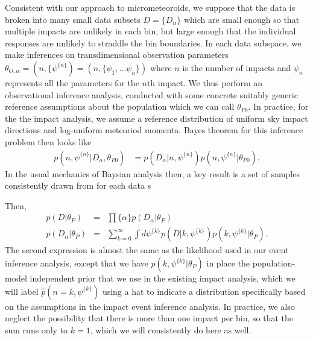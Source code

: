\documentclass[twocolumn,showpacs,aps,prd,nobibnotes,nofootinbib,floatfix]{revtex4-1}
\begin{document}
Consistent with our approach to micrometeoroids, we suppose that the data is broken into many small data subsets $D=\{D_\alpha\}$ which are small enough so that multiple impacts are unlikely in each bin, but large enough that the individual responses are unlikely to straddle the bin boundaries. 
In each data subspace, we make inferences on transdimensional observation parameters $\theta_{O,\alpha}=(n,\{\psi^{\{n\}})=(n,\{\psi_1,...\psi_n\})$ where $n$ is the number of impacts and $\psi_n$ represents all the parameters for the $n$th impact.
We thus perform an observational inference analysis, conducted with some concrete suitably generic reference assumptions about the population which we can call $\theta_{P0}$.  In practice, for the the impact analysis, we assume a reference distribution of uniform sky impact directions and log-uniform meteoriod momenta.  Bayes theorem for this inference problem then looks like
\begin{align}
  p(n,\psi^{\{n\}}|D_\alpha,\theta_{P0})&= p(D_\alpha|n,\psi^{\{n\}})p(n,\psi^{\{n\}}|\theta_{P0}).
\end{align}
In the usual mechanics of Baysian analysis then, a key result is a set of samples consistently drawn from for each data s

Then,
\begin{eqnarray}
  p(D|\theta_P)&=&\prod{\{\alpha\}} p(D_\alpha|\theta_P)\\
  p(D_\alpha|\theta_P)&=&\sum_{k=0}^\infty\int d\psi^{\{k\}} p(D|k,\psi^{\{k\}})p(k,\psi^{\{k\}}|\theta_P).
\end{eqnarray}
The second expression is almost the same as the likelihood used in our event inference analysis, except that we have $p(k,\psi^{\{k\}}|\theta_P)$ in place the population-model independent prior that we use in the existing impact analysis, which we will label $\hat p(n=k,\psi^{\{k\}})$ using a hat to indicate a distribution specifically based on the assumptions in the impact event inference analysis. In practice, we also neglect the possibility that there is more than one impact per bin, so that the sum runs only to $k=1$, which we will consistently do here as well.
\end{document}
